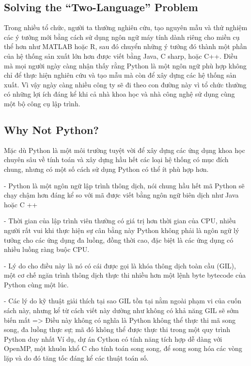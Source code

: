 \subsection{Solving the “Two-Language” Problem}
\quad Trong nhiều tổ chức, người ta thường nghiên cứu, tạo nguyên mẫu và thử nghiệm các ý tưởng mới bằng cách sử dụng ngôn ngữ máy tính dành riêng cho miền cụ thể hơn như MATLAB hoặc R, sau đó chuyển những ý tưởng đó thành một phần của hệ thống sản xuất lớn hơn được viết bằng Java, C sharp, hoặc C++. Điều mà mọi người ngày càng nhận thấy rằng Python là một ngôn ngữ phù hợp không chỉ để thực hiện nghiên cứu và tạo mẫu mà còn để xây dựng các hệ thống sản xuất. Vì vậy ngày càng nhiều công ty sẽ đi theo con đường này vì tổ chức thường có những lợi ích đáng kể khi cả nhà khoa học và nhà công nghệ sử dụng cùng một bộ công cụ lập trình.

\subsection{Why Not Python?}
\quad Mặc dù Python là một môi trường tuyệt vời để xây dựng các ứng dụng khoa học chuyên sâu về tính toán và xây dựng hầu hết các loại hệ thống có mục đích chung, nhưng có một số cách sử dụng Python có thể ít phù hợp hơn.\par
- Python là một ngôn ngữ lập trình thông dịch, nói chung hầu hết mã Python sẽ chạy chậm hơn đáng kể so với mã được viết bằng ngôn ngữ biên dịch như Java hoặc C ++\par
- Thời gian của lập trình viên thường có giá trị hơn thời gian của CPU, nhiều người rất vui khi thực hiện sự cân bằng này
Python không phải là ngôn ngữ lý tưởng cho các ứng dụng đa luồng, đồng thời cao, đặc biệt là các ứng dụng có nhiều luồng ràng buộc CPU.\par
- Lý do cho điều này là nó có cái được gọi là khóa thông dịch toàn cầu (GIL), một cơ chế ngăn trình thông dịch thực thi nhiều hơn một lệnh byte bytecode của Python cùng một lúc.\par
- Các lý do kỹ thuật giải thích tại sao GIL tồn tại nằm ngoài phạm vi của cuốn sách này, nhưng kể từ
cách viết này dường như không có khả năng GIL sẽ sớm biến mất \newline
=> Điều này không có nghĩa là Python không thể thực thi mã song song, đa luồng thực sự; mã đó không thể được thực thi trong một quy trình Python duy nhất\newline
Ví dụ, dự án Cython có tính năng tích hợp dễ dàng với OpenMP, một khuôn khổ C cho tính toán song song, để song song hóa các vòng lặp và do đó tăng tốc đáng kể các thuật toán số.
